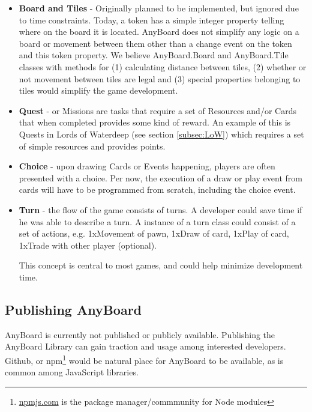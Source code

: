 \begin{itemize}

\item \textbf{Board and Tiles} - Originally planned to be implemented, but ignored due to time constraints. Today, a token has a simple integer property telling where on the board it is located. AnyBoard does not simplify any logic on a board or movement between them other than a change event on the token and this token property. We believe AnyBoard.Board and AnyBoard.Tile classes  with methods for (1) calculating distance between tiles, (2) whether or not movement between tiles are legal and (3) special properties belonging to tiles would simplify the game development.

\item \textbf{Quest} - or Missions are tasks that require a set of Resources and/or Cards that when completed provides some kind of reward. An example of this is Quests in Lords of Waterdeep (see section \ref{subsec:LoW}) which requires a set of simple resources and provides points.

\item \textbf{Choice} - upon drawing Cards or Events happening, players are often presented with a choice. Per now, the execution of a draw or play event from cards will have to be programmed from scratch, including the choice event.

\item \textbf{Turn} - the flow of the game consists of turns. A developer could save time if he was able to describe a turn. A instance of a turn class could consist of a set of actions, e.g. 1xMovement of pawn, 1xDraw of card, 1xPlay of card, 1xTrade with other player (optional). 

This concept is central to most games, and could help minimize development time.

\end{itemize}

\subsection{Publishing AnyBoard}
AnyBoard is currently not published or publicly available. Publishing the AnyBoard Library can gain traction and usage among interested developers. Github, or npm\footnote{\href{http://npmjs.com}{npmjs.com} is the package manager/commmunity for Node modules} would be natural place for AnyBoard to be available, as is common among JavaScript libraries. 

